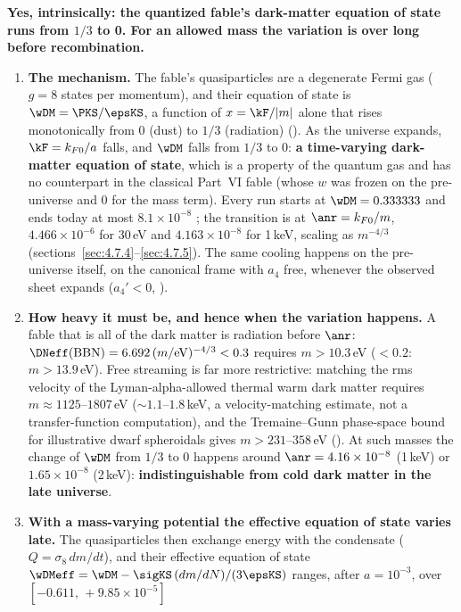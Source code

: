 \textbf{Yes, intrinsically: the quantized fable's dark-matter equation of state runs from $1/3$ to 0. For an
allowed mass the variation is over long before recombination.}
\begin{enumerate}
  \item \textbf{The mechanism.} The fable's quasiparticles are a degenerate Fermi gas ($g=8$ states per
        momentum), and their equation of state is $\wDM=\PKS/\epsKS$, a function of $x=\kF/|m|$ alone that rises
        monotonically from 0 (dust) to $1/3$ (radiation) (). As the universe expands,
        $\kF=k_{F0}/a$ falls, and $\wDM$ falls from $1/3$ to 0: \textbf{a time-varying dark-matter equation of
        state}, which is a property of the quantum gas and has no counterpart in the classical Part~VI fable
        (whose $w$ was frozen on the pre-universe and 0 for the mass term). Every run starts at
        $\wDM=0.333333$ and ends today at most $8.1\times10^{-8}$ ; the transition is at
        $\anr=k_{F0}/m$, $4.466\times10^{-6}$ for 30\,eV and $4.163\times10^{-8}$ for 1\,keV, scaling as
        $m^{-4/3}$ (sections~\ref{sec:4.7.4}--\ref{sec:4.7.5}). The same cooling happens on the pre-universe itself,
        on the canonical frame with $a_4$ free, whenever the observed sheet expands ($a_4'<0$, ).
  \item \textbf{How heavy it must be, and hence when the variation happens.} A fable that is all of the dark
        matter is radiation before $\anr$: $\DNeff(\mathrm{BBN})=6.692\,(m/\mathrm{eV})^{-4/3}<0.3$ requires
        $m>10.3$\,eV ($<0.2$: $m>13.9$\,eV). Free streaming is far more restrictive: matching the rms velocity of
        the Lyman-alpha-allowed thermal warm dark matter requires $m\approx1125$--$1807$\,eV
        (${\sim}1.1$--$1.8$\,keV, a velocity-matching estimate, not a transfer-function computation), and the
        Tremaine--Gunn phase-space bound for illustrative dwarf spheroidals gives $m>231$--$358$\,eV
        (). At such masses the change of $\wDM$ from $1/3$ to 0 happens around
        $\anr=4.16\times10^{-8}$ (1\,keV) or $1.65\times10^{-8}$ (2\,keV): \textbf{indistinguishable from cold dark
        matter in the late universe}.
  \item \textbf{With a mass-varying potential the effective equation of state varies late.} The quasiparticles
        then exchange energy with the condensate ($Q=\sigma_8\,dm/dt$), and their effective equation of state
        $\wDMeff=\wDM-\sigKS\,(dm/dN)/(3\epsKS)$ ranges, after $a=10^{-3}$, over $[-0.611,\,+9.85\times10^{-5}]$

\end{enumerate}
